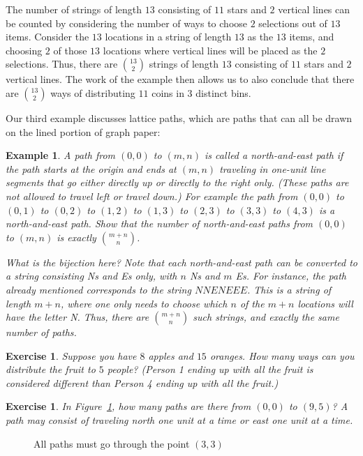 \documentclass{book}
\newcounter{ekcounter}%
\theoremstyle{ekimcustom}
\newtheorem{example}[ekcounter]{Example}
\newtheorem{exercise}[ekcounter]{Exercise}
\begin{document}
The number of strings of length $13$ consisting of $11$ stars and $2$ vertical lines can be counted by considering the number of ways to choose $2$ selections out of $13$ items. Consider the $13$ locations in a string of length $13$ as the $13$ items, and choosing $2$ of those $13$ locations where vertical lines will be placed as the $2$ selections. Thus, there are $\binom{13}{2}$ strings of length $13$ consisting of $11$ stars and $2$ vertical lines. The work of the example then allows us to also conclude that there are $\binom{13}{2}$ 
ways of distributing $11$ coins in $3$ distinct bins.

Our third example discusses lattice paths, which are paths that can all be drawn on the lined portion of graph paper:
\begin{example}
A path from $(0,0)$ to $(m,n)$ is called a north-and-east path if the path starts at the origin and ends at $(m,n)$ traveling in one-unit line segments that go either directly up or directly to the right only. (These paths are not allowed to travel left or travel down.) For example the path from $(0,0)$ to $(0,1)$ to $(0,2)$ to $(1,2)$ to $(1,3)$ to $(2,3)$ to $(3,3)$ to $(4,3)$ is a north-and-east path. Show that the number of north-and-east paths from $(0,0)$ to $(m,n)$ is exactly $\binom{m+n}{n}$.

What is the bijection here? Note that each north-and-east path can be converted to a string consisting Ns and Es only, with $n$ Ns and $m$ Es. For instance, the path already mentioned corresponds to the string $NNENEEE$. This is a string of length $m+n$, where one only needs to choose which $n$ of the $m+n$ locations will have the letter N. Thus, there are $\binom{m+n}{n}$ such strings, and exactly the same number of paths.
\end{example}

\begin{exercise}
Suppose you have $8$ apples and $15$ oranges. How many ways can you distribute the fruit to $5$ people? (Person 1 ending up with all the fruit is considered different than Person 4 ending up with all the fruit.)
\end{exercise}

\begin{exercise}
In Figure~\ref{figure:paths-through-point}, how many paths are there from $(0,0)$ to $(9,5)$? A path may consist of traveling north one unit at a time or east one unit at a time.
\end{exercise}
\begin{figure}[hbt] %
\begin{center}
\caption{All paths must go through the point $(3,3)$}\label{figure:paths-through-point}
\end{center}
\end{figure}
\end{document}
